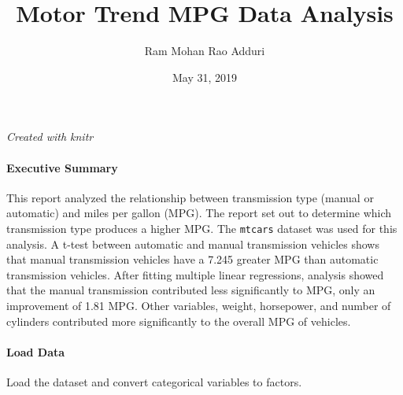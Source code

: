 \documentclass[]{article}
\title{Motor Trend MPG Data Analysis}
\author{Ram Mohan Rao Adduri}
\date{May 31, 2019}
\newenvironment{Shaded}{\begin{snugshade}}{\end{snugshade}}
\newcommand{\DataTypeTok}[1]{\textcolor[rgb]{0.13,0.29,0.53}{#1}}
\newcommand{\DecValTok}[1]{\textcolor[rgb]{0.00,0.00,0.81}{#1}}
\newcommand{\KeywordTok}[1]{\textcolor[rgb]{0.13,0.29,0.53}{\textbf{#1}}}
\newcommand{\NormalTok}[1]{#1}
\newcommand{\OperatorTok}[1]{\textcolor[rgb]{0.81,0.36,0.00}{\textbf{#1}}}
\newcommand{\StringTok}[1]{\textcolor[rgb]{0.31,0.60,0.02}{#1}}
\let\oldparagraph\paragraph
\renewcommand{\paragraph}[1]{\oldparagraph{#1}\mbox{}}
\begin{document}
\maketitle

\emph{Created with knitr}

\hypertarget{executive-summary}{%
\paragraph{Executive Summary}\label{executive-summary}}

This report analyzed the relationship between transmission type (manual
or automatic) and miles per gallon (MPG). The report set out to
determine which transmission type produces a higher MPG. The
\texttt{mtcars} dataset was used for this analysis. A t-test between
automatic and manual transmission vehicles shows that manual
transmission vehicles have a 7.245 greater MPG than automatic
transmission vehicles. After fitting multiple linear regressions,
analysis showed that the manual transmission contributed less
significantly to MPG, only an improvement of 1.81 MPG. Other variables,
weight, horsepower, and number of cylinders contributed more
significantly to the overall MPG of vehicles.

\hypertarget{load-data}{%
\paragraph{Load Data}\label{load-data}}

Load the dataset and convert categorical variables to factors.

\begin{Shaded}
\end{Shaded}
\end{document}
